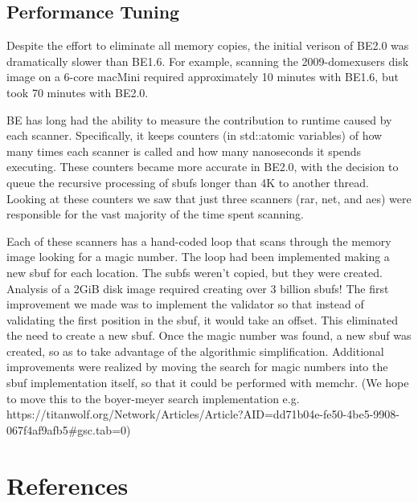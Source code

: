 \documentclass[5p]{elsarticle}
\begin{document}
\subsection{Performance Tuning}
Despite the effort to eliminate all memory copies, the initial verison
of BE2.0 was dramatically slower than BE1.6. For example, scanning the
2009-domexusers disk image on a 6-core macMini required approximately 10 minutes
with BE1.6, but took 70 minutes with BE2.0.

BE has long had the ability to measure the contribution to runtime
caused by each scanner. Specifically, it keeps counters (in
std::atomic variables) of how many times each scanner is called and
how many nanoseconds it spends executing. These counters became more
accurate in BE2.0, with the decision to queue the recursive processing
of sbufs longer than 4K to another thread. Looking at these counters
we saw that just three scanners (rar, net, and aes) were responsible
for the vast majority of the time spent scanning.

Each of these scanners has a hand-coded loop that scans through the
memory image looking for a magic number. The loop had been implemented
making a new sbuf for each location. The subfs weren't copied, but
they were created.  Analysis of a 2GiB disk image required creating
over 3 billion sbufs!  The first improvement we made was to implement
the validator so that instead of validating the first position in the
sbuf, it would take an offset. This eliminated the need to create a
new sbuf. Once the magic number was found, a new sbuf was created, so
as to take advantage of the algorithmic simplification. Additional
improvements were realized by moving the search for magic numbers into
the sbuf implementation itself, so that it could be performed with
memchr. (We hope to move this to the boyer-meyer search implementation
e.g. https://titanwolf.org/Network/Articles/Article?AID=dd71b04e-fe50-4be5-9908-067f4af9afb5#gsc.tab=0)



\section*{References}


\end{document}
